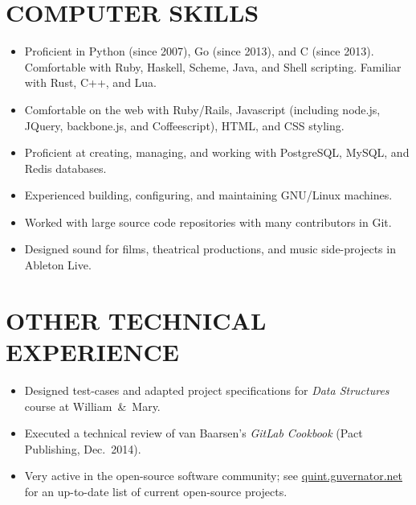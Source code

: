 \documentclass{res}     %
\begin{document}
\begin{resume}

\section{COMPUTER SKILLS}
\vspace{5mm}
\begin{itemize}[leftmargin=5mm]
\item Proficient in Python (since 2007), Go (since 2013), and C (since 2013). Comfortable with Ruby, Haskell, Scheme, Java, and Shell scripting. Familiar with Rust, C++, and Lua.
\item Comfortable on the web with Ruby/Rails, Javascript (including node.js, JQuery, backbone.js, and Coffeescript), HTML, and CSS styling.
\item Proficient at creating, managing, and working with PostgreSQL, MySQL, and Redis databases.
\item Experienced building, configuring, and maintaining GNU/Linux machines.
\item Worked with large source code repositories with many contributors in Git.
\item Designed sound for films, theatrical productions, and music side-projects in Ableton Live.
\end{itemize}
 
\section{OTHER TECHNICAL EXPERIENCE}
\vspace{5mm}
\begin{itemize}[leftmargin=5mm]
\item Designed test-cases and adapted project specifications for \emph{Data Structures} course at William~\&~Mary.
\item Executed a technical review of van Baarsen's \emph{GitLab Cookbook} (Pact Publishing, Dec.\ 2014).
\item Very active in the open-source software community; see \url{quint.guvernator.net} for an up-to-date list of current open-source projects.
\end{itemize}


\end{resume}
\end{document}

